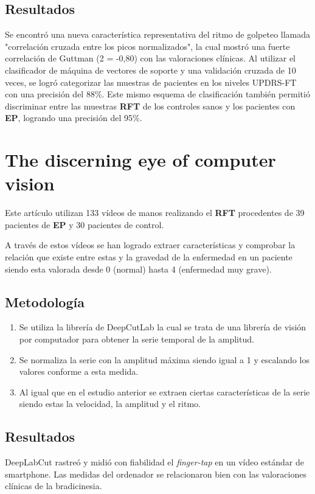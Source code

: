 \subsection{Resultados}
Se encontró una nueva característica representativa del ritmo de golpeteo llamada "correlación cruzada entre los picos normalizados", la cual mostró una fuerte correlación de Guttman (2 = -0,80) con las valoraciones clínicas. Al utilizar el clasificador de máquina de vectores de soporte y una validación cruzada de 10 veces, se logró categorizar las muestras de pacientes en los niveles UPDRS-FT con una precisión del 88\%. Este mismo esquema de clasificación también permitió discriminar entre las muestras \textbf{RFT} de los controles sanos y los pacientes con \textbf{EP}, logrando una precisión del 95\%.


\section{The discerning eye of computer vision}
Este artículo utilizan 133 vídeos de manos realizando el \textbf{RFT} procedentes de 39 pacientes de \textbf{EP} y 30 pacientes de control.

A través de estos vídeos se han logrado extraer características y comprobar la relación que existe entre estas y la gravedad de la enfermedad en un paciente siendo esta valorada desde 0 (normal) hasta 4 (enfermedad muy grave).


\subsection{Metodología}
\begin{enumerate}
	\item Se utiliza la librería de DeepCutLab la cual se trata de una librería de visión por computador para obtener la serie temporal de la amplitud.
	\item Se normaliza la serie con la amplitud máxima siendo igual a 1 y escalando los valores conforme a esta medida.
	\item Al igual que en el estudio anterior se extraen ciertas características de la serie siendo estas la velocidad, la amplitud y el ritmo.

\end{enumerate}
\subsection{Resultados}
DeepLabCut rastreó y midió con fiabilidad el \textit{finger-tap} en un vídeo estándar de smartphone. Las medidas del ordenador se relacionaron bien con las valoraciones clínicas de la bradicinesia.


